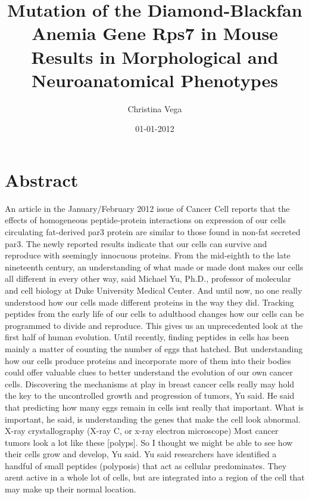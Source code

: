 \documentclass{article}%
\title{Mutation of the Diamond{-}Blackfan Anemia Gene Rps7 in Mouse Results in Morphological and Neuroanatomical Phenotypes}%
\author{Christina Vega}%
\affil{CAS Key Laboratory of Pathogenic Microbiology and Immunology, Institute of Microbiology, Chinese Academy of Sciences, Beijing, China}%
\date{01{-}01{-}2012}%
\begin{document}
%
\normalsize%
\maketitle%
\section{Abstract}%
\label{sec:Abstract}%
An article in the January/February 2012 issue of Cancer Cell reports that the effects of homogeneous peptide{-}protein interactions on expression of our cells circulating fat{-}derived par3 protein are similar to those found in non{-}fat secreted par3.\newline%
The newly reported results indicate that our cells can survive and reproduce with seemingly innocuous proteins. From the mid{-}eighth to the late nineteenth century, an understanding of what made or made dont makes our cells all different in every other way, said Michael Yu, Ph.D., professor of molecular and cell biology at Duke University Medical Center. And until now, no one really understood how our cells made different proteins in the way they did.\newline%
Tracking peptides from the early life of our cells to adulthood changes how our cells can be programmed to divide and reproduce. This gives us an unprecedented look at the first half of human evolution.\newline%
Until recently, finding peptides in cells has been mainly a matter of counting the number of eggs that hatched. But understanding how our cells produce proteins and incorporate more of them into their bodies could offer valuable clues to better understand the evolution of our own cancer cells.\newline%
Discovering the mechanisms at play in breast cancer cells really may hold the key to the uncontrolled growth and progression of tumors, Yu said.\newline%
He said that predicting how many eggs remain in cells isnt really that important. What is important, he said, is understanding the genes that make the cell look abnormal.\newline%
X{-}ray crystallography (X{-}ray C, or x{-}ray electron microscope)\newline%
Most cancer tumors look a lot like these {[}polyps{]}. So I thought we might be able to see how their cells grow and develop, Yu said.\newline%
Yu said researchers have identified a handful of small peptides (polyposis) that act as cellular predominates. They arent active in a whole lot of cells, but are integrated into a region of the cell that may make up their normal location.\newline%
\end{document}
